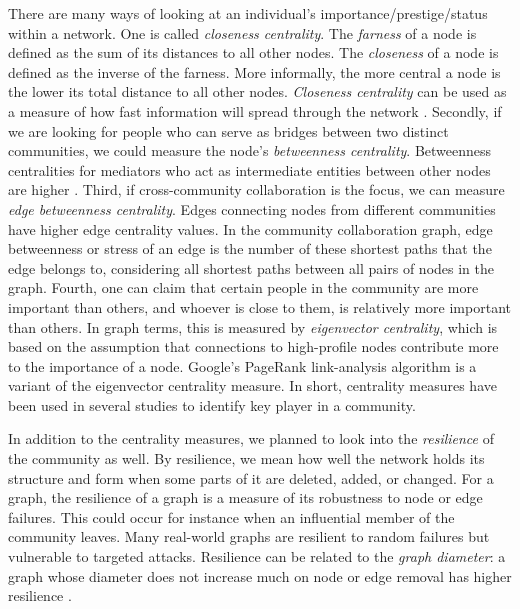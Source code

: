 \documentclass[11pt]{report}
\begin{document}
\begin{appendices}
There are many ways of looking at an individual's importance/prestige/status within a network. One is called \textit{closeness centrality}. The \textit{farness} of a node is defined as the sum of its distances to all other nodes. The \textit{closeness} of a node is defined as the inverse of the farness. More informally, the more central a node is the lower its total distance to all other nodes. \textit{Closeness centrality} can be used as a measure of how fast information will spread through the network \cite{Chakrabarti}. Secondly, if we are looking for people who can serve as bridges between two distinct communities, we could measure the node's \textit{betweenness centrality}. Betweenness centralities for mediators who act as intermediate entities between other nodes are higher \cite{Chakrabarti}.  Third, if cross-community collaboration is the focus, we can measure \textit{edge betweenness centrality}.  Edges connecting nodes from different communities have higher edge centrality values. In the community collaboration graph, edge betweenness or stress of an edge is the number of these shortest paths that the edge belongs to, considering all shortest paths between all pairs of nodes in the graph. Fourth, one can claim that certain people in the community are more important than others, and whoever is close to them, is relatively more important than others. In graph terms, this is measured by \textit{eigenvector centrality}, which is based on the assumption that connections to high-profile nodes contribute more to the importance of a node. Google's PageRank link-analysis algorithm \cite{Page} is a variant of the eigenvector centrality measure. In short, centrality measures have been used in several studies to identify key player in a community.

In addition to the centrality measures, we planned to look into the \textit{resilience} of the community as well. By resilience, we mean how well the network holds its structure and form when some parts of it are deleted, added, or changed. For a graph, the resilience of a graph is a measure of its robustness to node or edge failures. This could occur for instance when an influential member of the community leaves. Many real-world graphs are resilient to random failures but vulnerable to targeted attacks. Resilience can be related to the \textit{graph diameter}: a graph whose diameter does not increase much on node or edge removal has higher resilience \cite{Chakrabarti}.


\end{appendices}
\end{document}
